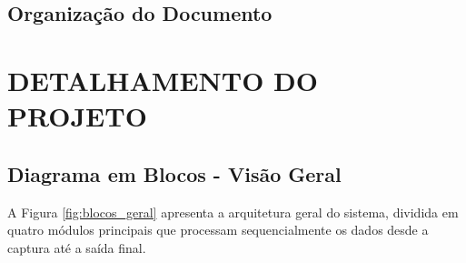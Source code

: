 \documentclass[12pt, a4paper]{article}
\begin{document}
\subsection{Organização do Documento}

\section{DETALHAMENTO DO PROJETO}

\subsection{Diagrama em Blocos - Visão Geral}

A Figura \ref{fig:blocos_geral} apresenta a arquitetura geral do sistema, dividida em quatro módulos principais que processam sequencialmente os dados desde a captura até a saída final.
\end{document}
